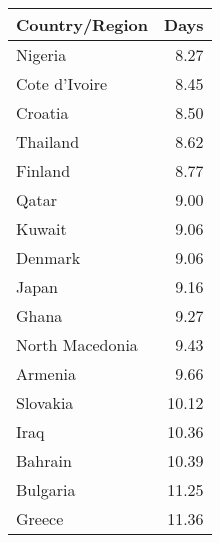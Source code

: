 \begin{tabular}{lr}
\toprule
  Country/Region &  Days \\
\midrule
         Nigeria &  8.27 \\
   Cote d'Ivoire &  8.45 \\
         Croatia &  8.50 \\
        Thailand &  8.62 \\
         Finland &  8.77 \\
           Qatar &  9.00 \\
          Kuwait &  9.06 \\
         Denmark &  9.06 \\
           Japan &  9.16 \\
           Ghana &  9.27 \\
 North Macedonia &  9.43 \\
         Armenia &  9.66 \\
        Slovakia & 10.12 \\
            Iraq & 10.36 \\
         Bahrain & 10.39 \\
        Bulgaria & 11.25 \\
          Greece & 11.36 \\
\bottomrule
\end{tabular}
